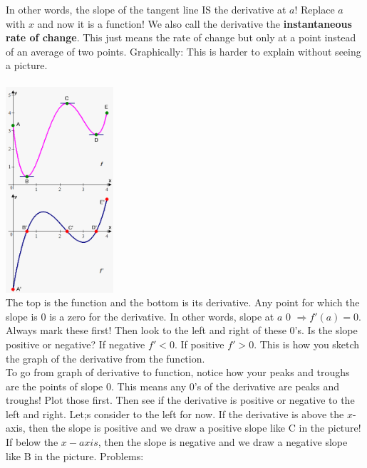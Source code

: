 \documentclass[10pt]{article}
\theoremstyle{Theorem}
\theoremstyle{definition}
\theoremstyle{remark}
\theoremstyle{custom}
\begin{document}
\noindent In other words, the slope of the tangent line IS the derivative at $a$! Replace $a$ with $x$ and now it is a function! We also call the derivative the \textbf{instantaneous rate of change}. This just means the rate of change but only at a point instead of an average of two points.
\newpage
\noindent Graphically: This is harder to explain without seeing a picture. \\\\
\includegraphics[width=4cm]{deriv.png}\\
The top is the function and the bottom is its derivative. Any point for which the slope is 0 is a zero for the derivative. In other words, slope at $a$ 0 $\Rightarrow f'(a)=0$. Always mark these first! Then look to the left and right of these 0's. Is the slope positive or negative? If negative $f'<0$. If positive $f'>0$. This is how you sketch the graph of the derivative from the function.\\
To go from graph of derivative to function, notice how your peaks and troughs are the points of slope 0. This means any 0's of the derivative are peaks and troughs! Plot those first. Then see if the derivative is positive or negative to the left and right. Let;s consider to the left for now. If the derivative is above the $x$-axis, then the slope is positive and we draw a positive slope like C in the picture! If below the $x-axis$, then the slope is negative and we draw a negative slope like B in the picture.
\newpage
Problems:
\end{document}

